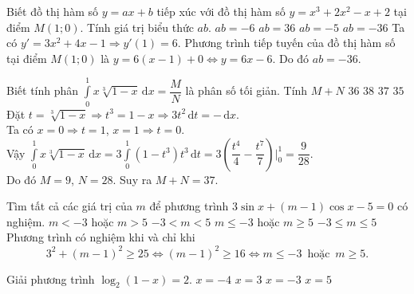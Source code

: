 \begin{ex}%
	Biết đồ thị hàm số $y=ax + b$ tiếp xúc với đồ thị hàm số $y=x^3 +2x^2 -x + 2$ tại điểm $M(1;0)$. Tính giá trị biểu thức $ab$.  
	\choice
	{$ab=-6$}
	{$ab=36$}
	{$ab=-5$}
	{\True $ab=-36$}
	\loigiai
	{Ta có $y'=3x^2 +4x - 1 \Rightarrow y'(1)=6$. Phương trình tiếp tuyến của đồ thị hàm số tại điểm $M(1;0)$ là $y=6(x-1)+0 \Leftrightarrow y=6x-6$. Do đó $ab=-36$.
	}
\end{ex}
\begin{ex}%
	Biết tính phân $\displaystyle\int\limits_0^1 x\sqrt[3]{1-x} \mathrm{\,d}x = \dfrac{M}{N}$ là phân số tối giản. Tính $M + N$  
	\choice
	{$36$}
	{$38$}
	{\True $37$}
	{$35$}
	\loigiai
	{
		Đặt $t= \sqrt[3]{1-x}\Rightarrow t^3 = 1 - x \Rightarrow 3t^2 \mathrm{\,d}t = - \mathrm{\,d}x$.\\
		Ta có $x=0 \Rightarrow t=1$, $x=1 \Rightarrow t = 0$.\\
		Vậy
		$\displaystyle\int\limits_0^1 x\sqrt[3]{1-x} \mathrm{\,d}x = 3\displaystyle\int\limits_0^1 \left(1 -t^3 \right)t^3 \mathrm{\,d}t =3\left( \dfrac{t^4}{4} - \dfrac{t^7}{7} \right) \bigg|_0^1 = \dfrac{9}{28}$.\\
		Do đó $M= 9$, $N=28$. Suy ra $M + N = 37$. 	
	}
\end{ex}
\begin{ex}%
	Tìm tất cả các giá trị của $m$ để phương trình $3\sin x + (m-1) \cos x - 5 = 0$ có nghiệm.   
	\choice
	{$m < -3$ hoặc $m>5$}
	{$-3 < m < 5$}
	{$m \leq -3$ hoặc $m \geq 5$}
	{\True $ -3 \leq m \leq 5$}
	\loigiai
	{Phương trình có nghiệm khi và chỉ khi $$3^2 + (m-1)^2 \geq 25 \Leftrightarrow (m-1)^2 \geq 16 \Leftrightarrow  m \leq -3 \, \text{ hoặc }\, m \geq 5.$$	
	}
\end{ex}
\begin{ex}%
	Giải phương trình $\log_2(1-x)=2$.
	\choice
	{$x=-4$}
	{$x=3$}
	{\True $x=-3$}
	{$ x=5$}
\end{ex}
